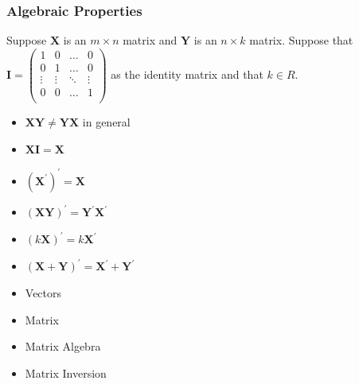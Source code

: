 \documentclass{beamer}
\numberwithin{equation}{section}
\begin{document}
\begin{frame}
\frametitle{Algebraic Properties} 

Suppose $\boldsymbol{X}$ is an $m \times n$ matrix and $\boldsymbol{Y}$ is an $n \times k$ matrix.  Suppose that $\boldsymbol{I} = \begin{pmatrix} 1 & 0 & \hdots & 0 \\
						0 & 1 & \hdots & 0 \\
						\vdots & \vdots & \ddots & \vdots \\
						0 			&   0 		& \hdots & 1 \\
						\end{pmatrix} $ as the identity matrix and that $k \in R$. \pause  
\begin{itemize}
\item[-] $\boldsymbol{X} \boldsymbol{Y} \neq \boldsymbol{Y} \boldsymbol{X}$ in general \pause
\item[-] $\boldsymbol{X}\boldsymbol{I} = \boldsymbol{X}$ \pause
\item[-] $(\boldsymbol{X}^{'} )^{'} = \boldsymbol{X}$ \pause
\item[-] $(\boldsymbol{X} \boldsymbol{Y})^{'} = \boldsymbol{Y}^{'} \boldsymbol{X}^{'}$ \pause
\item[-] $(k \boldsymbol{X})^{'} = k \boldsymbol{X}^{'}$ \pause
\item[-] $(\boldsymbol{X} + \boldsymbol{Y})^{'}  = \boldsymbol{X}^{'} + \boldsymbol{Y}^{'} $
\end{itemize}

\end{frame}



\begin{frame}

\begin{itemize}
\item \textcolor{mygray}{Vectors}
\item \textcolor{mygray}{Matrix}
\item \textcolor{mygray}{Matrix Algebra}
\item \textcolor{myblack}{Matrix Inversion}
\end{itemize}

\end{frame}
\end{document}
